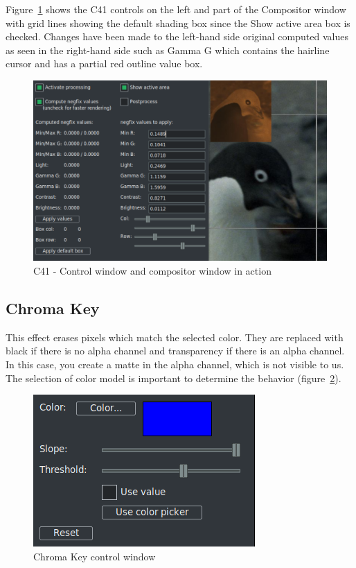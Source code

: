 Figure~\ref{fig:c41} shows the C41 controls on the left and part of the Compositor window with grid lines showing the default shading box since the Show active area box is checked. Changes have been made to the left-hand side original computed values as seen in the right-hand side such as Gamma G which contains the hairline cursor and has a partial red outline value box.

\begin{figure}[htpb]
    \centering
    \includegraphics[width=0.9\linewidth]{images/c41.png}
    \caption{C41 - Control window and compositor window in action}
    \label{fig:c41}
\end{figure}

\subsection{Chroma Key}%
\label{sub:chroma_key}

This effect erases pixels which match the selected color. They are replaced with black if there is no alpha channel and transparency if there is an alpha channel. In this case, you create a matte in the alpha channel, which is not visible to us. The selection of color model is important to determine the behavior (figure~\ref{fig:chroma-key}).

\begin{figure}[htpb]
    \centering
    \includegraphics[width=0.5\linewidth]{images/chroma-key.png}
    \caption{Chroma Key control window}
    \label{fig:chroma-key}
\end{figure}

